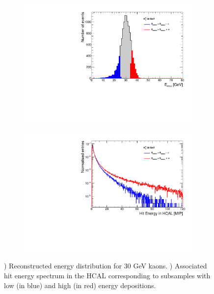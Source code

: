 \begin{figure}[htbp!]
  \centering
  \begin{subfigure}[t]{0.45\textwidth}
    \centering
    \includegraphics[width=1\linewidth]{../Thesis_Plots/ILD/AdditionalPlots/Plots/EnergySum_100ns_30GeV.pdf}
    \caption{} \label{fig:Esum30_100ns}
  \end{subfigure}
  \hfill
  \begin{subfigure}[t]{0.45\textwidth}
    \centering
    \includegraphics[width=1\linewidth]{../Thesis_Plots/ILD/AdditionalPlots/Plots/HitEnergySpectra_100ns_30GeV.pdf}
    \caption{} \label{fig:HitSpectra30_100ns}
  \end{subfigure}
  \caption{) Reconstructed energy distribution for 30 GeV kaons. ) Associated hit energy spectrum in the HCAL corresponding to subsamples with low (in blue) and high (in red) energy depositions.}
\end{figure}


